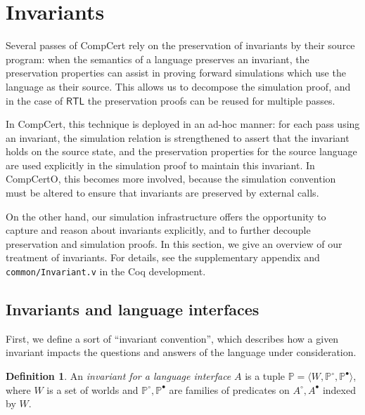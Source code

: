 \documentclass[11pt,oneside,draft]{book}
\theoremstyle{definition}
\newtheorem{definition}[theorem]{Definition}
\newcommand{\kw}[1]{\ensuremath{ \mathsf{#1} }}
\newcommand{\que}{\circ}         %
\newcommand{\ans}{\bullet}       %
\begin{document}


\section{Invariants} \label{sec:inv} %


Several passes of CompCert
rely on the preservation of invariants
by their source program:
when the semantics of a language preserves an invariant,
the preservation properties can assist
in proving forward simulations
which use the language as their source.
This allows us to decompose the simulation proof,
and in the case of $\kw{RTL}$
the preservation proofs can be reused for multiple passes.

In CompCert,
this technique is deployed in an ad-hoc manner:
for each pass using an invariant,
the simulation relation is strengthened to assert that
the invariant holds on the source state,
and the preservation properties for the source language
are used explicitly in the simulation proof
to maintain this invariant.
In CompCertO,
this becomes more involved,
because the simulation convention must be altered
to ensure that invariants are preserved
by external calls.

On the other hand,
our simulation infrastructure offers the opportunity
to capture and reason about invariants explicitly,
and to further decouple preservation and simulation proofs.
In this section,
we give an overview of our treatment of invariants.
For details,
see the supplementary appendix and
\texttt{common/Invariant.v}
in the Coq development.


\subsection{Invariants and language interfaces} %

First, we define a sort of ``invariant convention'',
which describes how a given invariant impacts the questions and answers
of the language under consideration.

\begin{definition} %
An \emph{invariant for a language interface} $A$
is a tuple
$\mathbb{P} = \langle W, \mathbb{P}^\que, \mathbb{P}^\ans \rangle$,
where $W$ is a set of worlds
and $\mathbb{P}^\que, \mathbb{P}^\ans$
are families of predicates on $A^\que, A^\ans$
indexed by $W$.
\end{definition}
\end{document}
